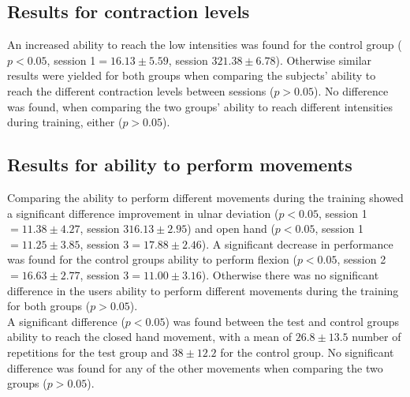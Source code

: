 \subsection{Results for contraction levels}
An increased ability to reach the low intensities was found for the control group ($p < 0.05$, session 1$ = 16.13 \pm 5.59$, session 3$ 21.38 \pm 6.78$). Otherwise similar results were yielded for both groups when comparing the subjects' ability to reach the different contraction levels between sessions ($p > 0.05$). No difference was found, when comparing the two groups' ability to reach different intensities during training, either ($p > 0.05$).

\subsection{Results for ability to perform movements}
Comparing the ability to perform different movements during the training showed a significant difference improvement in ulnar deviation ($p < 0.05$, session 1$ = 11.38 \pm 4.27$, session 3$ 16.13 \pm 2.95$) and open hand ($p < 0.05$, session 1$ = 11.25 \pm 3.85$, session 3$ = 17.88 \pm 2.46$). A significant decrease in performance was found for the control groups ability to perform flexion ($p < 0.05$, session 2$ = 16.63 \pm 2.77$, session 3$ = 11.00 \pm 3.16$). Otherwise there was no significant difference in the users ability to perform different movements during the training for both groups ($p > 0.05$).\\  
A significant difference ($p < 0.05$) was found between the test and control groups ability to reach the closed hand movement, with a mean of $26.8 \pm13.5$ number of repetitions for the test group and $38 \pm12.2$ for the control group. No significant difference was found for any of the other movements when comparing the two groups ($p > 0.05$).
%
